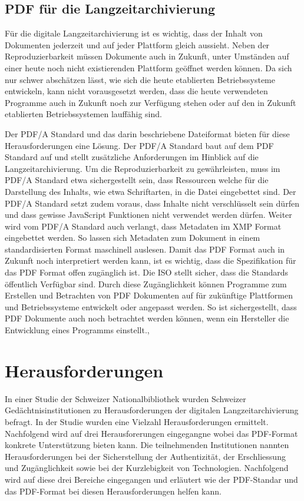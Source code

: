 \documentclass[a4paper,oneside, 12pt]{report}
\begin{document}
\section{PDF für die Langzeitarchivierung}
Für die digitale Langzeitarchivierung ist es wichtig, dass der Inhalt von Dokumenten jederzeit und auf jeder Plattform gleich aussieht. Neben der Reproduzierbarkeit müssen Dokumente auch in Zukunft, unter Umständen auf einer heute noch nicht existierenden Plattform geöffnet werden können. Da sich nur schwer abschätzen lässt, wie sich die heute etablierten Betriebssysteme entwickeln, kann nicht vorausgesetzt werden, dass die heute verwendeten Programme auch in Zukunft noch zur Verfügung stehen oder auf den in Zukunft etablierten Betriebssystemen lauffähig sind.

Der PDF/A Standard und das darin beschriebene Dateiformat bieten für diese Herausforderungen eine Lösung. Der PDF/A Standard baut auf dem PDF Standard auf und stellt zusätzliche Anforderungen im Hinblick auf die Langzeitarchivierung. Um die Reproduzierbarkeit zu gewährleisten, muss im PDF/A Standard etwa sichergestellt sein, dass Ressourcen welche für die Darstellung des Inhalts, wie etwa Schriftarten, in die Datei eingebettet sind. Der PDF/A Standard setzt zudem voraus, dass Inhalte nicht verschlüsselt sein dürfen und dass gewisse JavaScript Funktionen nicht verwendet werden dürfen. Weiter wird vom PDF/A Standard auch verlangt, dass Metadaten im \ac{XMP} Format eingebettet werden. So lassen sich Metadaten zum Dokument in einem standardisierten Format maschinell auslesen. Damit das PDF Format auch in Zukunft noch interpretiert werden kann, ist es wichtig, dass die Spezifikation für das PDF Format offen zugänglich ist. Die \ac{ISO} stellt sicher, dass die Standards öffentlich Verfügbar sind. Durch diese Zugänglichkeit können Programme zum Erstellen und Betrachten von PDF Dokumenten auf für zukünftige Plattformen und Betriebssysteme entwickelt oder angepasst werden. So ist sichergestellt, dass PDF Dokumente auch noch betrachtet werden können, wenn ein Hersteller die Entwicklung eines Programms einstellt.\cite{pdfanutshell}, \cite{Arms2005DigitalFF}

 
\chapter{Herausforderungen}\label{sec:herausforderungen}
In einer Studie der Schweizer Nationalbibliothek wurden Schweizer Gedächtnisinstitutionen zu Herausforderungen der digitalen Langzeitarchivierung befragt. In der Studie wurden eine Vielzahl Herausforderungen ermittelt. Nachfolgend wird auf drei Herausforerungen eingegangne wobei das PDF-Format konkrete Unterstützung bieten kann. Die teilnehmenden Institutionen nannten Herausforderungen bei der Sicherstellung der Authentizität, der Erschliessung und Zugänglichkeit sowie bei der Kurzlebigkeit von Technologien. Nachfolgend wird auf diese drei Bereiche eingegangen und erläutert wie der PDF-Standar und das PDF-Format bei diesen Herausforderungen helfen kann. \cite{lzaschweiz}
\end{document}
